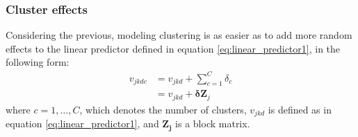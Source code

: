 \subsubsection{Cluster effects} \label{ss_sect:clusters}

Considering the previous, modeling clustering is as easier as to add more random effects to the linear predictor defined in equation \ref{eq:linear_predictor1}, in the following form:
\begin{equation} \label{eq:linear_predictor3}
	\begin{split}
		v_{jkdc} &= v_{jkd} + \sum_{c=1}^{C} \delta_{c}  \\
		&= v_{jkd} + \pmb{\delta} \mathbf{Z}_{j}
	\end{split}
\end{equation}
\noindent where $c=1, \dots, C$, which denotes the number of clusters, $v_{jkd}$ is defined as in equation \ref{eq:linear_predictor1}, and $\mathbf{Z_{j}}$ is a block matrix.
	


